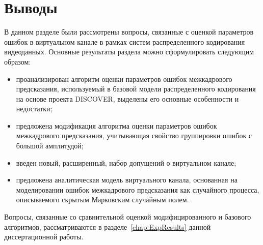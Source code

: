 \section{Выводы}

В данном разделе были рассмотрены вопросы, связанные с оценкой параметров ошибок в виртуальном канале в рамках систем распределенного кодирования видеоданных. Основные результаты раздела можно сформулировать следующим образом:
\begin{itemize}
    \item проанализирован алгоритм оценки параметров ошибок межкадрового предсказания, используемый в базовой модели распределенного кодирования на основе проекта DISCOVER, выделены его основные особенности и недостатки;
    \item предложена модификация алгоритма оценки параметров ошибок межкадрового предсказания, учитывающая свойство группировки ошибок с большой амплитудой;
    \item введен новый, расширенный, набор допущений о виртуальном канале;
    \item предложена аналитическая модель виртуального канала, основанная на моделировании ошибок межкадрового предсказания как случайного процесса, описываемого скрытым Марковским случайным полем.
\end{itemize}

Вопросы, связанные со сравнительной оценкой модифицированного и базового алгоритмов, рассматриваются в разделе~\ref{chap:ExpResults} данной диссертационной работы.
